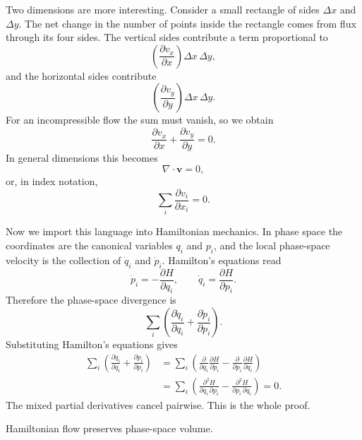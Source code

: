 Two dimensions are more interesting. Consider a small rectangle of sides \(\Delta x\) and \(\Delta y\). The net change in the number of points inside the rectangle comes from flux through its four sides. The vertical sides contribute a term proportional to
\[
\left(\frac{\partial v_x}{\partial x}\right)\Delta x\,\Delta y,
\]
and the horizontal sides contribute
\[
\left(\frac{\partial v_y}{\partial y}\right)\Delta x\,\Delta y.
\]
For an incompressible flow the sum must vanish, so we obtain
\begin{equation}
\frac{\partial v_x}{\partial x}+\frac{\partial v_y}{\partial y}=0.
\end{equation}
In general dimensions this becomes
\begin{equation}
\nabla\cdot \mathbf v = 0,
\end{equation}
or, in index notation,
\begin{equation}
\sum_i \frac{\partial v_i}{\partial x_i}=0.
\end{equation}

Now we import this language into Hamiltonian mechanics. In phase space the coordinates are the canonical variables \(q_i\) and \(p_i\), and the local phase-space velocity is the collection of \(\dot q_i\) and \(\dot p_i\). Hamilton's equations read
\begin{equation}
\dot p_i=-\frac{\partial H}{\partial q_i},
\qquad
\dot q_i=\frac{\partial H}{\partial p_i}.
\end{equation}
Therefore the phase-space divergence is
\begin{equation}
\sum_i\left(\frac{\partial \dot q_i}{\partial q_i}+\frac{\partial \dot p_i}{\partial p_i}\right).
\end{equation}
Substituting Hamilton's equations gives
\begin{align}
\sum_i\left(\frac{\partial \dot q_i}{\partial q_i}+\frac{\partial \dot p_i}{\partial p_i}\right)
&=
\sum_i\left(
\frac{\partial}{\partial q_i}\frac{\partial H}{\partial p_i}
-
\frac{\partial}{\partial p_i}\frac{\partial H}{\partial q_i}
\right) \\
&=
\sum_i\left(
\frac{\partial^2 H}{\partial q_i\,\partial p_i}
-
\frac{\partial^2 H}{\partial p_i\,\partial q_i}
\right)=0.
\end{align}
The mixed partial derivatives cancel pairwise. This is the whole proof.

\begin{theorem}
Hamiltonian flow preserves phase-space volume.
\end{theorem}

